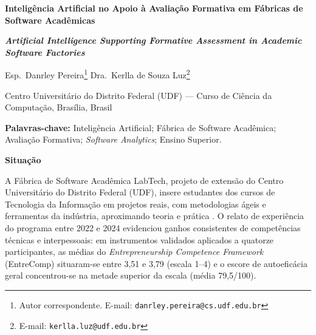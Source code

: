 \documentclass[12pt,a4paper]{article}
\newcommand{\secao}[1]{\medskip\noindent\textbf{#1}\par\nobreak\vspace{-0.1cm}}
\begin{document}
\begin{center}
{\fontsize{14pt}{17pt}\selectfont\bfseries
Inteligência Artificial no Apoio à Avaliação Formativa em Fábricas de
Software Acadêmicas\par}

\vspace{6pt}

{\fontsize{14pt}{17pt}\selectfont\bfseries\itshape
Artificial Intelligence Supporting Formative Assessment in Academic
Software Factories\par}

\vspace{12pt}

{\normalsize
Esp.~Danrley Pereira\footnote{Autor correspondente. E-mail:
\texttt{danrley.pereira@cs.udf.edu.br}} \quad
Dra.~Kerlla de Souza Luz\footnote{E-mail: \texttt{kerlla.luz@udf.edu.br}}\par}

\vspace{2pt}

{\small Centro Universitário do Distrito Federal (UDF) --- Curso de Ciência da
Computação, Brasília, Brasil\par}
\end{center}

\vspace{6pt}

\noindent\textbf{Palavras-chave:} Inteligência Artificial; Fábrica de Software
Acadêmica; Avaliação Formativa; \textit{Software Analytics}; Ensino Superior.

\vspace{4pt}

\secao{Situação}

A Fábrica de Software Acadêmica LabTech, projeto de extensão do Centro
Universitário do Distrito Federal (UDF), insere estudantes dos cursos de
Tecnologia da Informação em projetos reais, com metodologias ágeis e
ferramentas da indústria, aproximando teoria e prática
\cite{cusumano1991japan,dos2021experiencia,oliveira2017conduccao}. O relato de
experiência do programa entre 2022 e 2024 \cite{pereira2026cadernos} evidenciou
ganhos consistentes de competências técnicas e interpessoais: em instrumentos
validados aplicados a quatorze participantes, as médias do
\textit{Entrepreneurship Competence Framework} (EntreComp)
\cite{bacigalupo2016entrecomp} situaram-se entre 3,51 e 3,79 (escala 1--4) e o
escore de autoeficácia geral \cite{sherer1982gse} concentrou-se na metade
superior da escala (média 79,5/100).
\end{document}
